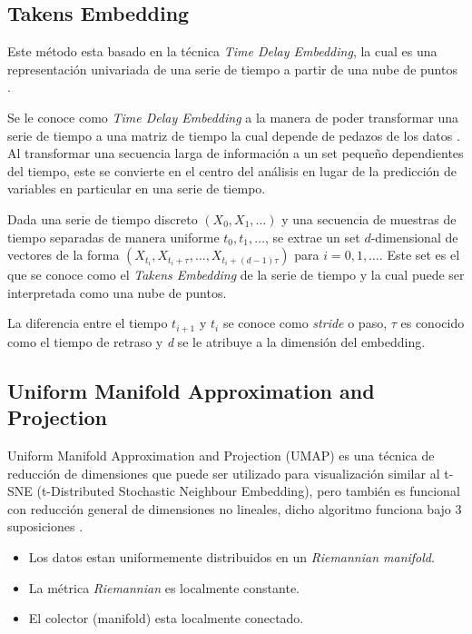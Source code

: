 \documentclass{article}
\begin{document}
        \subsection{Takens Embedding}

            Este método esta basado en la técnica \emph{Time Delay Embedding}, la cual es una representación univariada de una serie de tiempo a partir de una nube de puntos \cite{gudhiembedding}.

            Se le conoce como \emph{Time Delay Embedding} a la manera de poder transformar una serie de tiempo a una matriz de tiempo la cual depende de pedazos de los datos \cite{timedelay}. Al transformar una secuencia larga de información a un set pequeño dependientes del tiempo, este se convierte en el centro del análisis en lugar de la predicción de variables en particular en una serie de tiempo.

            Dada una serie de tiempo discreto $(X_{0},X_{1},\dots)$ y una secuencia de muestras de tiempo separadas de manera uniforme $t_{0},t_{1},\dots$, se extrae un set $d$-dimensional de vectores de la forma $(X_{t_{i}},X_{t_{i}+\tau},\dots,X_{t_{i}+(d-1)\tau})$ para $i = 0,1,\dots$. Este set es el que se conoce como el \emph{Takens Embedding} de la serie de tiempo y la cual puede ser interpretada como una nube de puntos.

            La diferencia entre el tiempo $t_{i+1}$ y $t_{i}$ se conoce como \emph{stride} o paso, $\tau$ es conocido como el tiempo de retraso y \emph{d} se le atribuye a la dimensión del embedding.

        \subsection{Uniform Manifold Approximation and Projection}

            Uniform Manifold Approximation and Projection (UMAP) es una técnica de reducción de dimensiones que puede ser utilizado para visualización similar al t-SNE (t-Distributed Stochastic Neighbour Embedding), pero también es funcional con reducción general de dimensiones no lineales, dicho algoritmo funciona bajo 3 suposiciones \cite{umap}.

            \begin{itemize}[noitemsep]
                \item Los datos estan uniformemente distribuidos en un \emph{Riemannian manifold}.
                \item La métrica \emph{Riemannian} es localmente constante.
                \item El colector (manifold) esta localmente conectado.
            \end{itemize}
\end{document}
